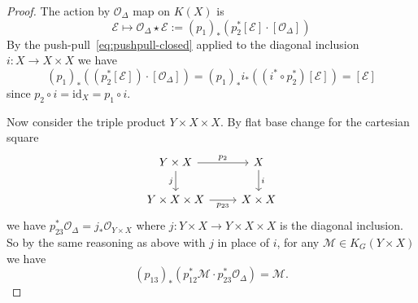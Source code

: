 \documentclass[11pt]{amsart}
\theoremstyle{definition}
\newtheorem{remark}[dummy]{Remark}
\newcommand{\Ec}{\mathcal{E}}
\newcommand{\Oc}{\mathcal{O}}
\numberwithin{equation}{subsection}
\numberwithin{figure}{subsection}
\begin{document}
\begin{proof}
 The action by $\Oc_\Delta$ map on $K(X)$ is
$$
\Ec\mapsto \Oc_\Delta\star \Ec:=(p_1)_*\left(p_2^*[\Ec]\cdot [\Oc_{\Delta}]\right)
$$
By the push-pull~\eqref{eq:pushpull-closed} applied to the diagonal inclusion $i:X\rightarrow X\times X$ we have 
$$
(p_1)_*\left((p_2^*[\Ec])\cdot[\Oc_\Delta]\right) 
=(p_1)_*i_*((i^*\circ p_2^*)[\Ec])=[\Ec]
$$
since $p_2\circ i = \mathrm{id}_X=p_1\circ i$.

Now consider the triple product $Y\times X\times X$. By flat base change for the cartesian square
$$
\begin{tikzcd}
Y\times X \arrow{r}{p_2} \arrow[swap]{d}{j}& X \arrow{d}{i} \\
Y\times X\times X \arrow[swap]{r}{p_{23}} & X\times X
\end{tikzcd}
$$
we have $p_{23}^*\Oc_\Delta = j_*\Oc_{Y\times X}$ where $j:Y\times X\rightarrow Y\times X\times X$ is the diagonal inclusion.
So by the same reasoning as above with $j$ in place of $i$, for any $\mathcal{M} \in K_G(Y\times X)$ we have
$$
(p_{13})_*\left(p_{12}^*\mathcal{M}\cdot p_{23}^*\Oc_\Delta\right)=\mathcal{M}.
$$

\end{proof}
\end{document}
